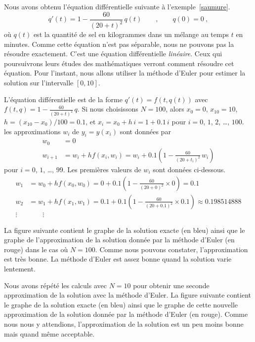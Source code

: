 {\begin{egg}
Nous avons obtenu l'équation différentielle suivante à l'exemple~\ref{saumure}.
\[
  q'(t) = 1 - \frac{60}{(20+t)^2} \, q(t) \qquad , \qquad
  q(0) = 0 \ ,
\]
où $q(t)$ est la quantité de sel en kilogrammes dans un mélange au
temps $t$ en minutes.  Comme cette équation n'est pas séparable, nous ne
pouvons pas la résoudre exactement.  C'est une équation différentielle
{\em linéaire}.  Ceux qui poursuivrons leurs études des mathématiques
verront comment résoudre cet équation.  Pour l'instant, nous
allons utiliser la méthode d'Euler pour estimer la solution sur
l'intervalle $[0,10]$.

L'équation différentielle est de la forme $q'(t) = f(t,q(t))$ avec
$\displaystyle f(t,q) = 1 - \frac{60}{(20+t)^2} \, q$.  Si nous choisissons
$N=100$, alors $x_0 = 0$, $x_{10}=10$, $h = (x_{10}-x_0)/100 = 0.1$,
et $x_i = x_0 + h\, i = 1 + 0.1\,i$ pour $i=0$, $1$, $2$, \ldots,
$100$.  les approximations $w_i$ de $y_i = y(x_i)$ sont données par 
\begin{align*}
w_0 & = 0 \\
  w_{i+1} & = w_i + h f(x_i,w_i) = w_i +  0.1 \left(
1 - \frac{60}{(20+t_i)^2} \, w_i \right)
\end{align*}
pour $i=0$, $1$, \ldots, $99$.  Les premières valeurs de $w_i$ sont
données ci-dessous.
\begin{align*}
 w_1 &= w_0 + h f(x_0, w_0) =  0 + 0.1 \left( 1 - \frac{60}{(20+0)^2}
\times 0\right) = 0.1 \\
w_2 &= w_1 + h f(x_1, w_1) =  0.1 + 0.1 \left( 1 - \frac{60}{(20+0.1)^2}
\times 0.1\right) \approx 0.198514888 \\
  \vdots & \qquad \vdots
\end{align*}

La figure suivante contient le graphe de la solution
exacte (en bleu) ainsi que le graphe de l'approximation de la solution
donnée par la méthode d'Euler (en rouge) dans le cas où $N=100$.
Comme nous pouvons constater, l'approximation est très bonne.  La
méthode d'Euler est assez bonne quand la solution varie lentement.

Nous avons répété les calculs avec $N=10$ pour obtenir une seconde
approximation de la solution avec la méthode d'Euler.
La figure suivante contient le graphe de la solution
exacte (en bleu) ainsi que le graphe de cette nouvelle approximation
de la solution donnée par la méthode d'Euler (en rouge).
Comme nous nous y attendions, l'approximation de
la solution est un peu moins bonne mais quand même acceptable.
\end{egg}

}  %

